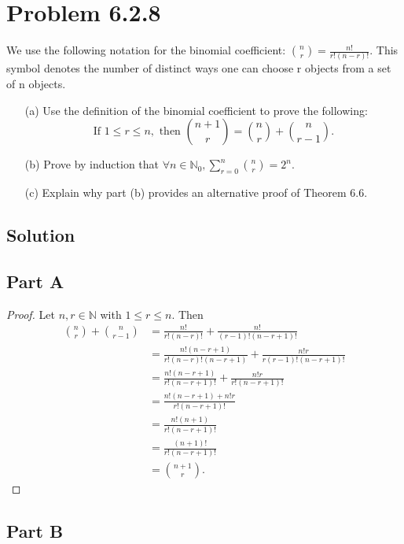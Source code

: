 \documentclass[12pt]{extarticle}
\begin{document}
\section*{Problem 6.2.8}

We use the following notation for the binomial coefficient: $\binom{n}{r} = \frac{n!}{r! (n-r)!}$. This symbol denotes the number of distinct ways one can choose r objects from a set of n objects.

\begin{enumerate}
	\item[(a)]
		Use the definition of the binomial coefficient to prove the following:
		\[
			\text{If } 1 \leq r \leq n, \text{ then } \binom{n + 1}{r} = \binom{n}{r} + \binom{n}{r-1}
		.\]
	\item[(b)]
		Prove by induction that $\forall n \in \mathbb{N}_0, \displaystyle\sum_{r=0}^n \binom{n}{r} = 2^n$.
	\item[(c)]
		Explain why part (b) provides an alternative proof of Theorem 6.6.
\end{enumerate}

\subsection*{Solution}
\subsection*{Part A}

\begin{proof}
	Let $n,r \in \mathbb{N}$ with $1 \leq r \leq n$. Then
	\begin{align*}
		\binom{n}{r} + \binom{n}{r-1} &= \frac{n!}{r! (n-r)!} + \frac{n!}{(r-1)!(n-r+1)!} \\
		&= \frac{n! (n-r+1)}{r! (n-r)! (n-r+1)} + \frac{n! r}{r (r-1)! (n-r+1)!} \\
		&= \frac{n! (n-r+1)}{r! (n-r+1)!} + \frac{n! r}{r! (n-r+1)!} \\
		&= \frac{n! (n-r+1)+ n! r}{r! (n-r+1)!} \\
		&= \frac{n! (n+1)}{r! (n-r+1)!} \\
		&= \frac{(n+1)!}{r! (n-r+1)!} \\
		&= \binom{n+1}{r}
	.\end{align*}
\end{proof}

\subsection*{Part B}
\end{document}
